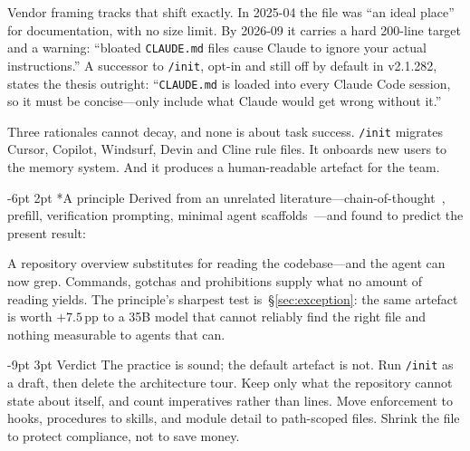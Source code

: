 \documentclass[10pt,twocolumn,a4paper]{article}
\makeatletter
\renewcommand\section{\@startsection{section}{1}{\z@}%
  {-9pt \@plus -2pt \@minus -1pt}{3pt}%
  {\normalfont\large\bfseries\color{acc}}}
\renewcommand\subsection{\@startsection{subsection}{2}{\z@}%
  {-6pt \@plus -1pt \@minus -1pt}{2pt}%
  {\normalfont\normalsize\bfseries}}
\makeatother
\begin{document}
Vendor framing tracks that shift exactly. In 2025-04 the file was ``an ideal
place'' for documentation, with no size limit. By
2026-09 it carries a hard 200-line target and a warning: ``bloated
\texttt{CLAUDE.md} files cause Claude to ignore your actual instructions.'' A
successor to \texttt{/init}, opt-in and still off by default in v2.1.282, states
the thesis outright: ``\texttt{CLAUDE.md} is loaded into every Claude Code session, so
it must be concise---only include what Claude would get wrong without it.''

Three rationales cannot decay, and none is about task success. \texttt{/init}
migrates Cursor, Copilot, Windsurf, Devin and Cline rule files. It onboards new
users to the memory system. And it produces a human-readable artefact for the
team.

\subsection*{A principle}
Derived from an unrelated literature---chain-of-thought~\cite{sprague}, prefill,
verification prompting, minimal agent scaffolds~\cite{agentless}---and found to
predict the present result:

\smallskip
\noindent{}
\smallskip

\noindent A repository overview substitutes for reading the codebase---and the
agent can now grep. Commands, gotchas and prohibitions supply what no amount of
reading yields. The principle's sharpest test is~\S\ref{sec:exception}: the same artefact is worth
$+7.5$\,pp to a 35B model that cannot reliably find the right file and nothing
measurable to agents that can.

\section{Verdict}
The practice is sound; the default artefact is not. Run \texttt{/init} as a draft,
then delete the architecture tour. Keep only what the repository cannot state
about itself, and count imperatives rather than lines. Move enforcement to hooks,
procedures to skills, and module detail to path-scoped files. Shrink the file to
protect compliance, not to save money.
\end{document}
